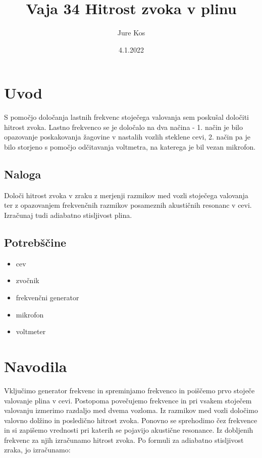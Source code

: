 \documentclass[a4paper]{report}
\title{Vaja 34 Hitrost zvoka v plinu}
\author {Jure Kos}
\date {4.1.2022}
\begin{document}
\maketitle

\chapter*{Uvod}

S pomočjo določanja lastnih frekvenc stoječega valovanja sem poskušal določiti hitrost zvoka. Lastno frekvenco se je določalo na dva načina - 1. način je bilo opazovanje poskakovanja žagovine v nastalih vozlih steklene cevi, 2. način pa je bilo storjeno s pomočjo odčitavanja voltmetra, na katerega je bil vezan mikrofon.

\section*{Naloga}
Določi hitrost zvoka v zraku z merjenji razmikov med vozli stoječega valovanja ter z opazovanjem frekvenčnih razmikov posameznih akustičnih resonanc v cevi. Izračunaj tudi adiabatno stisljivost plina.



\section*{Potrebščine}

\begin{itemize}
\item cev
\item zvočnik
\item frekvenčni generator
\item mikrofon
\item voltmeter
\end{itemize}







\chapter*{Navodila}

Vključimo generator frekvenc in spreminjamo frekvenco in poiščemo prvo stoječe valovanje plina v cevi.
Postopoma povečujemo frekvence in pri vsakem stoječem valovanju izmerimo razdaljo med dvema vozloma.
Iz razmikov med vozli določimo valovno dolžino in posledično hitrost zvoka. Ponovno se sprehodimo čez frekvence
in si zapišemo vrednosti pri katerih se pojavijo akustične resonance. Iz dobljenih frekvenc za njih izračunamo hitrost zvoka.
Po formuli za adiabatno stisljivost zraka, jo izračunamo:
\end{document}
